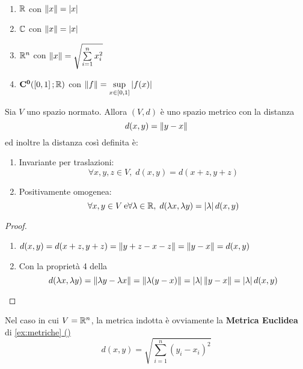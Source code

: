 \begin{example}
	~
	\begin{enumerate}
		\item $\mathbb{R}$ con $\left\|x\right\| = \left|x\right|$
		\item $\mathbb{C}$ con $\left\|x\right\| = \left|x\right|$
		\item $\mathbb{R}^n$ con $\left\|x\right\| = \sqrt{\sum\limits_{i=1}^{n}x_i^2}$
		\item $\mathbf{C^{0}}(\left[0,1\right];\mathbb{R})$ con $\left\|f\right\| = \sup\limits_{x \in \left[0,1\right]} \left|f(x)\right|$
	\end{enumerate}
\end{example}

\begin{proposition}
	\label{prop:dist_sp_norm}
	Sia $V$ uno spazio normato. Allora $(V,d)$ è uno spazio metrico con la distanza
	$$d(x,y) = \left\|y-x\right\|$$
	ed inoltre la distanza così definita è:
	\begin{enumerate}
		\item Invariante per traslazioni:
			$$\forall x,y,z \in V,\; d(x,y) = d(x+z, y+z)$$
		\item Positivamente omogenea:
			$$\forall x,y \in V\: \text{e} \forall \lambda \in \mathbb{R},\; d(\lambda x, \lambda y) = \left|\lambda\right|d(x,y)$$
	\end{enumerate}
	\begin{proof}
		~
		\begin{enumerate}
			\item $d(x,y) = d(x+z, y+z) = \left\|y+z-x-z\right\| = \left\|y-x\right\| = d(x,y)$
			\item Con la proprietà 4 della 
			$$d(\lambda x, \lambda y) = \left\|\lambda y - \lambda x\right\| = \left\|\lambda (y - x)\right\| = \left|\lambda\right| \left\|y - x\right\| = \left|\lambda\right|d(x,y)$$
		\end{enumerate}
	\end{proof}
	\begin{note}
		Nel caso in cui $V = \mathbb{R}^n$, la metrica indotta è ovviamente la \textbf{Metrica Euclidea} di \hyperref[ex:dist_eucl]{\cref*{ex:metriche} ()}
		$$d(x,y) = \sqrt{\sum\limits_{i=1}^{n} (y_i-x_i)^2 }$$
	\end{note}
\end{proposition}

